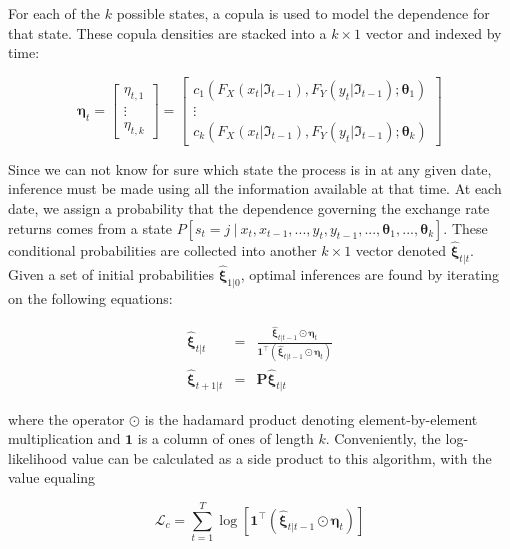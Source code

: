 \documentclass[12pt]{article}
\newcommand{\Lagr}{\mathcal{L}}
\newcommand{\boldXi}{\hat{\boldsymbol{\xi}}}
\begin{document}
For each of the $k$ possible states, a copula is used to model the dependence for that state. These copula densities are stacked into a $k\times 1$ vector and indexed by time:

\begin{equation}
\boldsymbol{\eta}_{t} = \left[ 
\begin{array}{c}
\eta _{t,1} \\ 
\vdots \\ 
\eta _{t,k}
\end{array}
\right] = \left[
\begin{array}{c}
c_{1}\left(F_{X}\left(x_{t} | \Im_{t-1}\right), F_{Y}\left(y_{t} | \Im_{t-1}\right) ;\mathbf{\theta}_{1}\right) \\ 
\vdots \\ 
c_{k}\left(F_{X}\left(x_{t} | \Im_{t-1}\right), F_{Y}\left(y_{t} | \Im_{t-1}\right) ;\mathbf{\theta }_{k}\right)
\end{array}
\right]
\end{equation}

Since we can not know for sure which state the process is in at any given date, inference must be made using all the information available at that time. At each date, we assign a probability that the dependence governing the exchange rate returns comes from a state $P\left[s_{t}=j~|~x_{t},x_{t-1},...,y_{t},y_{t-1},...,\mathbf{\theta}_{1},...,\mathbf{\theta}_{k}\right]$. These conditional probabilities are collected into another $k\times 1$ vector denoted $\boldXi_{t|t}$. Given a set of initial probabilities $\boldXi_{1|0}$, optimal inferences are found by iterating on the following equations:

\begin{eqnarray}
\boldXi_{t|t} &=& \frac{\boldXi_{t|t-1}\odot\boldsymbol{\eta}_{t}}{\mathbf{1}^{\top}\left(\boldXi_{t|t-1}\odot \boldsymbol{\eta}_{t}\right)} \\
\boldXi_{t+1|t} &=& \mathbf{P} \boldXi_{t|t}
\end{eqnarray}

where the operator $\odot$ is the hadamard product denoting element-by-element multiplication and $\mathbf{1}$ is a column of ones of length $k$. Conveniently, the log-likelihood value can be calculated as a side product to this algorithm, with the value equaling

\begin{equation}
\Lagr_{c} = \sum_{t=1}^{T}\log \left[\mathbf{1}^{\top}\left(\boldXi_{t|t-1} \odot \boldsymbol{\eta}_{t}\right)\right] 
\end{equation}
\end{document}
